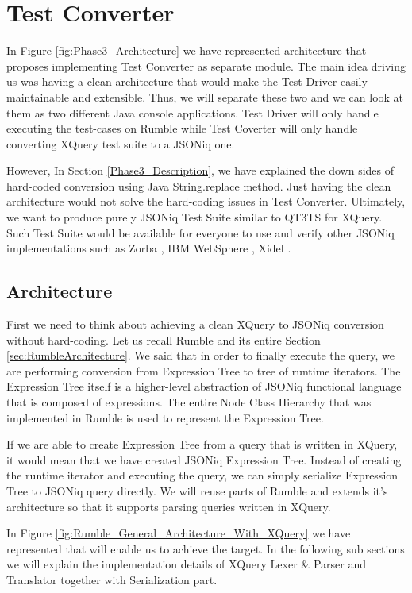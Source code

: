 
\chapter{Test Converter}
In Figure \ref{fig:Phase3_Architecture} we have represented architecture that proposes implementing Test Converter as separate module. The main idea driving us was having a clean architecture that would make the Test Driver easily maintainable and extensible. Thus, we will separate these two and we can look at them as two different Java console applications. Test Driver will only handle executing the test-cases on Rumble while Test Coverter will only handle converting XQuery test suite to a JSONiq one. 

However, In Section \ref{Phase3_Description}, we have explained the down sides of hard-coded conversion using Java String.replace method. Just having the clean architecture would not solve the hard-coding issues in Test Converter. Ultimately, we want to produce purely JSONiq Test Suite similar to QT3TS for XQuery. Such Test Suite would be available for everyone to use and verify other JSONiq implementations such as Zorba \cite{Zorba}, IBM WebSphere \cite{WebSphere}, Xidel \cite{Xidel}.

\section{Architecture}
First we need to think about achieving a clean XQuery to JSONiq conversion without hard-coding. Let us recall Rumble and its entire Section \ref{sec:RumbleArchitecture}. We said that in order to finally execute the query, we are performing conversion from Expression Tree to tree of runtime iterators. The Expression Tree itself is a higher-level abstraction of JSONiq functional language that is composed of expressions. The entire Node Class Hierarchy that was implemented in Rumble is used to represent the Expression Tree.

If we are able to create Expression Tree from a query that is written in XQuery, it would mean that we have created JSONiq Expression Tree. Instead of creating the runtime iterator and executing the query, we can simply serialize Expression Tree to JSONiq query directly. We will reuse parts of Rumble and extends it's architecture so that it supports parsing queries written in XQuery. 

In Figure \ref{fig:Rumble_General_Architecture_With_XQuery} we have represented that will enable us to achieve the target. In the following sub sections we will explain the implementation details of XQuery Lexer \& Parser and Translator together with Serialization part. 

